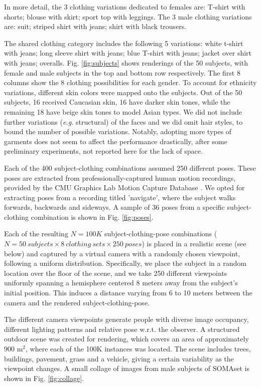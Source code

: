 \documentclass[10pt,journal,letterpaper,compsoc]{IEEEtran}
\begin{document}
In more detail, the 3 clothing variations dedicated to females are: T-shirt with shorts; blouse with skirt; sport top with leggings. The 3 male clothing variations are: suit; striped shirt with jeans; shirt with black trousers.

The shared clothing category includes the following 5 variations: white t-shirt with jeans; long sleeve shirt with jeans;  blue T-shirt with jeans; jacket over shirt with jeans; overalls.
Fig. \ref{fig:subjects} shows renderings of the 50 subjects, with female and male subjects in the top and bottom row respectively. The first 8 columns show the 8 clothing possibilities for each gender. To account for ethnicity variations, different skin colors were mapped onto the subjects. Out of the 50 subjects, 16 received Caucasian skin, 16 have darker skin tones, while the remaining 18 have beige skin tones to model Asian types.
We did not include further variations (\emph{e.g.} structural) of the faces and we did omit hair styles, to bound the number of possible variations. Notably, adopting more types of garments does not seem to affect the performance drastically, after some preliminary experiments, not reported here for the lack of space.

Each of the 400 subject-clothing combinations assumed 250 different poses. These poses are extracted from professionally-captured human motion recordings, provided by the CMU Graphics Lab Motion Capture Database \cite{CMUD}. We opted for extracting poses from a recording titled 'navigate', where the subject walks forwards, backwards and sideways. A sample of 36 poses from a specific subject-clothing combination is shown in Fig. \ref{fig:poses}.








Each of the resulting $N=100K$ subject-clothing-pose combinations ($N = 50 ~subjects \times 8 ~clothing~sets \times 250 ~poses$) is placed in a realistic scene (see below) and captured by a virtual camera
with a randomly chosen viewpoint, following a uniform distribution. Specifically, we place the subject in a random location over the floor of the scene, and we take 250 different viewpoints uniformly spanning a hemisphere centered 8 meters away from the subject's initial position. This induces a distance varying from 6 to 10 meters between the camera and the rendered subject-clothing-pose.

The different camera viewpoints generate people with diverse image occupancy, different lighting patterns and relative pose w.r.t. the observer. A structured outdoor scene was created for rendering, which covers an area of approximately $900$ m$^2$, where each of the 100K instances was located. The scene includes trees, buildings, pavement, grass and a vehicle, giving a certain variability as the viewpoint changes. A small collage of images from  male subjects of SOMAset is shown in Fig. \ref{fig:collage}.
\end{document}
